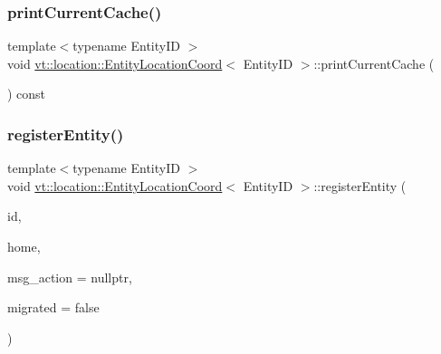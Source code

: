 \subsubsection{\texorpdfstring{print\+Current\+Cache()}{printCurrentCache()}}
{\footnotesize\ttfamily template$<$typename Entity\+ID $>$ \\
void \hyperlink{structvt_1_1location_1_1_entity_location_coord}{vt\+::location\+::\+Entity\+Location\+Coord}$<$ Entity\+ID $>$\+::print\+Current\+Cache (\begin{DoxyParamCaption}{ }\end{DoxyParamCaption}) const}

\mbox{\label{structvt_1_1location_1_1_entity_location_coord_a3d7f6c252ad5cb8d1084620946245970}} 
\subsubsection{\texorpdfstring{register\+Entity()}{registerEntity()}}
{\footnotesize\ttfamily template$<$typename Entity\+ID $>$ \\
void \hyperlink{structvt_1_1location_1_1_entity_location_coord}{vt\+::location\+::\+Entity\+Location\+Coord}$<$ Entity\+ID $>$\+::register\+Entity (\begin{DoxyParamCaption}\item[{Entity\+ID const \&}]{id,  }\item[{\hyperlink{namespacevt_a866da9d0efc19c0a1ce79e9e492f47e2}{Node\+Type} const \&}]{home,  }\item[{\hyperlink{namespacevt_1_1location_ad0a130e4d79e745543925240e13e8f08}{Loc\+Msg\+Action\+Type}}]{msg\+\_\+action = {\ttfamily nullptr},  }\item[{bool const \&}]{migrated = {\ttfamily false} }\end{DoxyParamCaption})}

\mbox{\label{structvt_1_1location_1_1_entity_location_coord_a4ac3edf13b0b6310b53d8a123c034a22}} 
